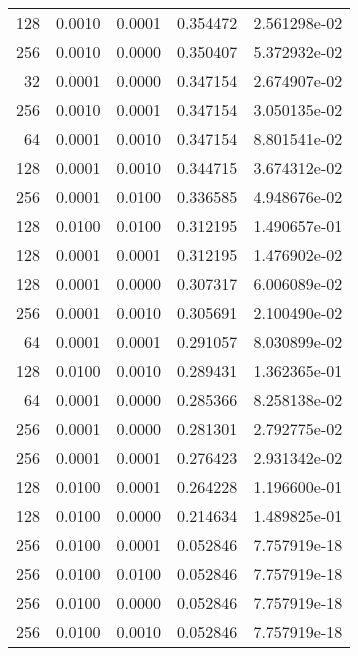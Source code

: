 \begin{tabular}{rrrrr}
 128 &  0.0010 &  0.0001 &  0.354472 &  2.561298e-02 \\
 256 &  0.0010 &  0.0000 &  0.350407 &  5.372932e-02 \\
  32 &  0.0001 &  0.0000 &  0.347154 &  2.674907e-02 \\
 256 &  0.0010 &  0.0001 &  0.347154 &  3.050135e-02 \\
  64 &  0.0001 &  0.0010 &  0.347154 &  8.801541e-02 \\
 128 &  0.0001 &  0.0010 &  0.344715 &  3.674312e-02 \\
 256 &  0.0001 &  0.0100 &  0.336585 &  4.948676e-02 \\
 128 &  0.0100 &  0.0100 &  0.312195 &  1.490657e-01 \\
 128 &  0.0001 &  0.0001 &  0.312195 &  1.476902e-02 \\
 128 &  0.0001 &  0.0000 &  0.307317 &  6.006089e-02 \\
 256 &  0.0001 &  0.0010 &  0.305691 &  2.100490e-02 \\
  64 &  0.0001 &  0.0001 &  0.291057 &  8.030899e-02 \\
 128 &  0.0100 &  0.0010 &  0.289431 &  1.362365e-01 \\
  64 &  0.0001 &  0.0000 &  0.285366 &  8.258138e-02 \\
 256 &  0.0001 &  0.0000 &  0.281301 &  2.792775e-02 \\
 256 &  0.0001 &  0.0001 &  0.276423 &  2.931342e-02 \\
 128 &  0.0100 &  0.0001 &  0.264228 &  1.196600e-01 \\
 128 &  0.0100 &  0.0000 &  0.214634 &  1.489825e-01 \\
 256 &  0.0100 &  0.0001 &  0.052846 &  7.757919e-18 \\
 256 &  0.0100 &  0.0100 &  0.052846 &  7.757919e-18 \\
 256 &  0.0100 &  0.0000 &  0.052846 &  7.757919e-18 \\
 256 &  0.0100 &  0.0010 &  0.052846 &  7.757919e-18 \\
\bottomrule
\end{tabular}
